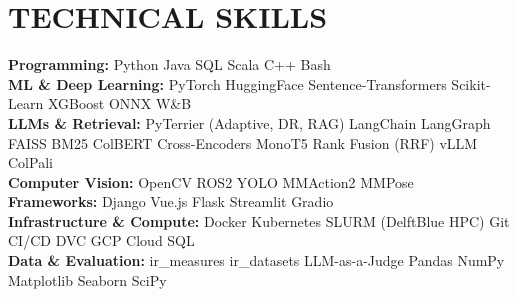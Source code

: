 \documentclass[letterpaper,11pt]{article}
\begin{document}
\section{\color{airforceblue}TECHNICAL SKILLS}
\begin{itemize}[leftmargin=0in, label={}]
  \small{\item{
                \textbf{\normalsize{Programming:}}{ \normalsize{Python \textbullet{} Java \textbullet{} SQL \textbullet{} Scala \textbullet{} C++ \textbullet{} Bash}} \\
                \vspace{1.2pt}
                \textbf{\normalsize{ML \& Deep Learning:}}{ \normalsize{PyTorch \textbullet{} HuggingFace \textbullet{} Sentence-Transformers \textbullet{} Scikit-Learn \textbullet{} XGBoost \textbullet{} ONNX \textbullet{} W\&B}} \\
                \vspace{1.2pt}
                \textbf{\normalsize{LLMs \& Retrieval:}}{ \normalsize{PyTerrier (Adaptive, DR, RAG) \textbullet{} LangChain \textbullet{} LangGraph \textbullet{} FAISS \textbullet{} BM25 \textbullet{} ColBERT \textbullet{} Cross-Encoders \textbullet{} MonoT5 \textbullet{} Rank Fusion (RRF) \textbullet{} vLLM \textbullet{} ColPali}} \\
                \vspace{1.2pt}
                \textbf{\normalsize{Computer Vision:}}{ \normalsize{OpenCV \textbullet{} ROS2 \textbullet{} YOLO \textbullet{} MMAction2 \textbullet{} MMPose}} \\
                \vspace{1.2pt}
                \textbf{\normalsize{Frameworks:}}{ \normalsize{Django \textbullet{} Vue.js \textbullet{} Flask \textbullet{} Streamlit \textbullet{} Gradio}} \\
                \vspace{1.2pt}
                \textbf{\normalsize{Infrastructure \& Compute:}}{ \normalsize{Docker \textbullet{} Kubernetes \textbullet{} SLURM (DelftBlue HPC) \textbullet{} Git \textbullet{} CI/CD \textbullet{} DVC \textbullet{} GCP Cloud SQL}} \\
                \vspace{1.2pt}
                \textbf{\normalsize{Data \& Evaluation:}}{ \normalsize{ir\_measures \textbullet{} ir\_datasets \textbullet{} LLM-as-a-Judge \textbullet{} Pandas \textbullet{} NumPy \textbullet{} Matplotlib \textbullet{} Seaborn \textbullet{} SciPy}} \\
                \vspace{1.2pt}
          }}
\end{itemize}
\vspace{-16pt}
\end{document}
